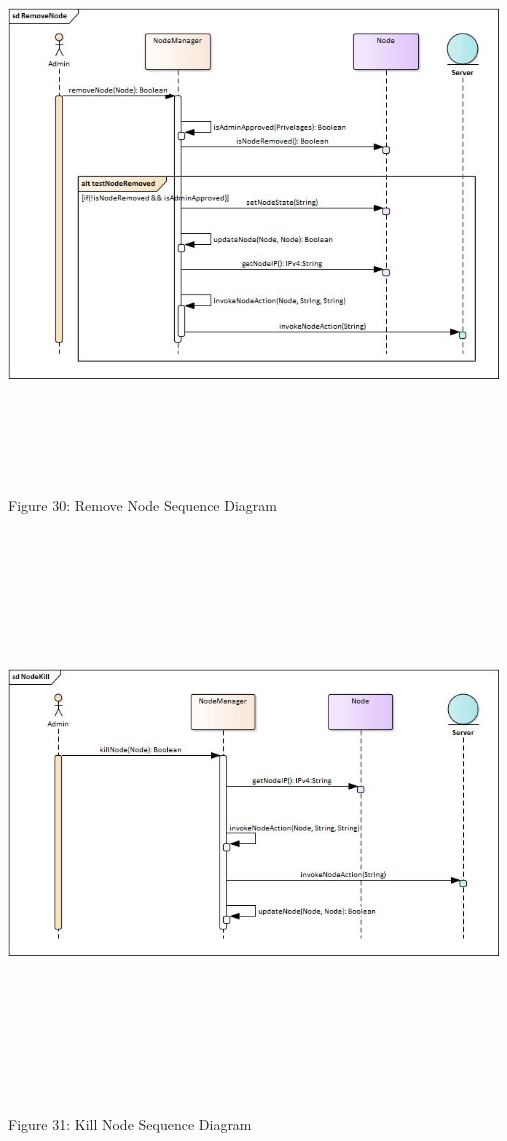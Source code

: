     \includegraphics[width=13cm,height=15cm,keepaspectratio]{admin_ui/images/sequence_diagrams/RemoveNode.jpg}
		\begin{center}
	    \small{Figure 30: Remove Node Sequence Diagram}
    \end{center}
    
     \includegraphics[width=13cm,height=15cm,keepaspectratio]{admin_ui/images/sequence_diagrams/NodeKill.jpg}
		\begin{center}
	    \small{Figure 31: Kill Node Sequence Diagram}
    \end{center}
    
